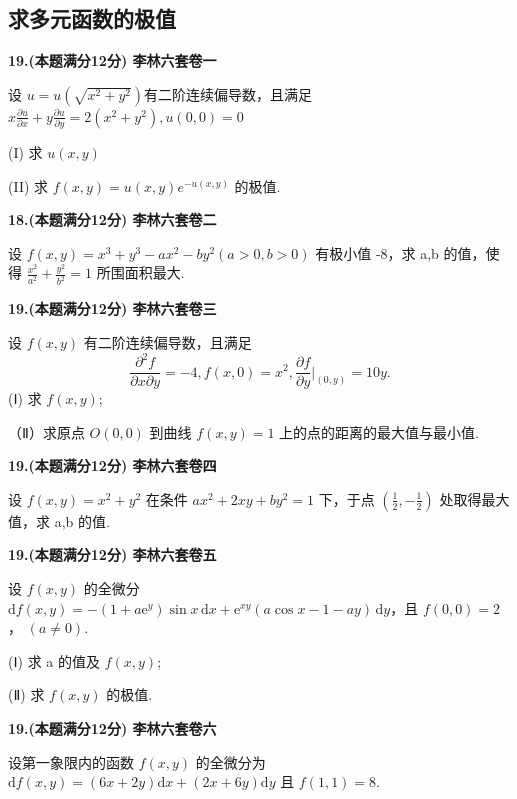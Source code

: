 \documentclass[a4paper,12pt]{article}
\begin{document}
\subsection{求多元函数的极值}

\textbf{19.(本题满分12分) 李林六套卷一}

设 $u=u\left(\sqrt{x^{2}+y^{2}}\right)$有二阶连续偏导数，且满足 $x\frac{\partial u}{\partial x}+y\frac{\partial u}{\partial y}=2\left(x^{2}+y^{2}\right),u(0,0)=0$

(I) 求 $u(x, y)$

(II) 求 $f(x, y) = u(x, y) e^{-u(x, y)}$ 的极值.

\vspace{0.5cm}

\textbf{18.(本题满分12分) 李林六套卷二}

设 $f(x,y)=x^{3}+y^{3}-ax^{2}-by^{2}(a>0,b>0)$ 有极小值 -8，求 a,b 的值，使得 $\frac{x^{2}}{a^{2}}+\frac{y^{2}}{b^{2}}=1$ 所围面积最大.

\vspace{0.5cm}

\textbf{19.(本题满分12分) 李林六套卷三}

设 $f(x,y)$ 有二阶连续偏导数，且满足
\[ \frac{\partial^{2}f}{\partial x\partial y}=-4,f(x,0)=x^{2},\frac{\partial f}{\partial y}\bigg|_{(0,y)}=10y. \]
(Ⅰ) 求 $f(x, y)$;

（Ⅱ）求原点 $O(0,0)$ 到曲线 $f(x,y)=1$ 上的点的距离的最大值与最小值.

\vspace{0.5cm}

\textbf{19.(本题满分12分) 李林六套卷四}

设 $f(x,y)=x^{2}+y^{2}$ 在条件 $ax^{2}+2xy+by^{2}=1$ 下，于点 $\left(\frac{1}{2},-\frac{1}{2}\right)$ 处取得最大值，求 a,b 的值.

\vspace{0.5cm}

\textbf{19.(本题满分12分) 李林六套卷五}

设 $ f(x,y) $ 的全微分 $ \mathrm{d}f(x,y) = -(1 + a\mathrm{e}^{y})\sin x \, \mathrm{d}x + \mathrm{e}^{xy}(a\cos x - 1 - ay) \, \mathrm{d}y $，且 $ f(0,0) = 2 $， $ (a \neq 0) $.

(Ⅰ) 求 a 的值及 $f(x,y)$;

(Ⅱ) 求 $f(x,y)$ 的极值.

\vspace{0.5cm}

\textbf{19.(本题满分12分) 李林六套卷六}

设第一象限内的函数 $f(x,y)$ 的全微分为 $\mathrm{d}f(x,y)=(6x+2y)\mathrm{d}x+(2x+6y)\mathrm{d}y$ 且 $f(1,1)=8.$
\end{document}
